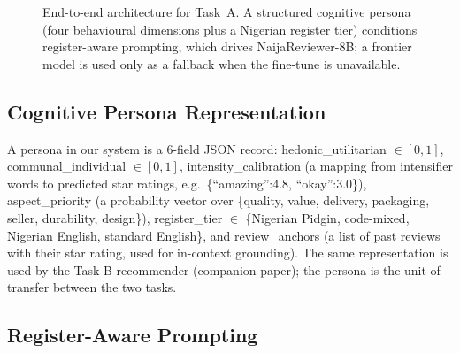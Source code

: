 \documentclass[sigconf,nonacm,balance]{acmart}
\begin{document}
\begin{figure}[t]
  \centering
  \caption{End-to-end architecture for Task~A. A structured cognitive persona
  (four behavioural dimensions plus a Nigerian register tier) conditions
  register-aware prompting, which drives NaijaReviewer-8B; a frontier model is
  used only as a fallback when the fine-tune is unavailable.}
  \label{fig:arch-a}
\end{figure}

\subsection{Cognitive Persona Representation}

A persona in our system is a 6-field JSON record:
\textsf{hedonic\_utilitarian} $\in [0,1]$,
\textsf{communal\_individual} $\in [0,1]$,
\textsf{intensity\_calibration} (a mapping from intensifier words to predicted
star ratings, e.g.\ \textsf{\{``amazing'':4.8, ``okay'':3.0\}}),
\textsf{aspect\_priority} (a probability vector over
\{quality, value, delivery, packaging, seller, durability, design\}),
\textsf{register\_tier} $\in$ \{Nigerian Pidgin, code-mixed,
Nigerian English, standard English\}, and
\textsf{review\_anchors} (a list of past reviews with their star rating,
used for in-context grounding). The same representation is used by the
Task-B recommender (companion paper); the persona is the unit of transfer
between the two tasks.

\subsection{Register-Aware Prompting}
\end{document}
